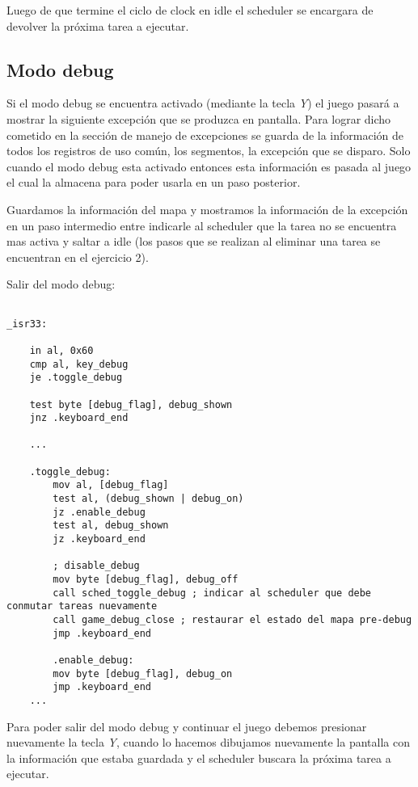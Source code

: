 	Luego de que termine el ciclo de clock en idle el scheduler se encargara de devolver la próxima tarea a ejecutar.

	\subsection{Modo debug}
	Si el modo debug se encuentra activado (mediante la tecla \textit{Y}) el juego pasará a mostrar la siguiente excepción que se produzca en pantalla. Para lograr dicho cometido en la sección de manejo de excepciones se guarda de la información de todos los registros de uso común, los segmentos, la excepción que se disparo. Solo cuando el modo debug esta activado entonces esta información es pasada al juego el cual la almacena para poder usarla en un paso posterior.

	Guardamos la información del mapa y mostramos la información de la excepción en un paso intermedio entre indicarle al scheduler que la tarea no se encuentra mas activa y saltar a idle (los pasos que se realizan al eliminar una tarea se encuentran en el ejercicio 2).

	Salir del modo debug:

	\begin{lstlisting}

_isr33:

    in al, 0x60
    cmp al, key_debug
    je .toggle_debug

    test byte [debug_flag], debug_shown
    jnz .keyboard_end

    ...

    .toggle_debug:
        mov al, [debug_flag]
        test al, (debug_shown | debug_on)
        jz .enable_debug
        test al, debug_shown
        jz .keyboard_end

        ; disable_debug
        mov byte [debug_flag], debug_off
        call sched_toggle_debug ; indicar al scheduler que debe conmutar tareas nuevamente
        call game_debug_close ; restaurar el estado del mapa pre-debug
        jmp .keyboard_end

        .enable_debug:
        mov byte [debug_flag], debug_on
        jmp .keyboard_end
    ...
	\end{lstlisting}

	Para poder salir del modo debug y continuar el juego debemos presionar nuevamente la tecla \textit{Y}, cuando lo hacemos dibujamos nuevamente la pantalla con la información que estaba guardada y el scheduler buscara la próxima tarea a ejecutar.